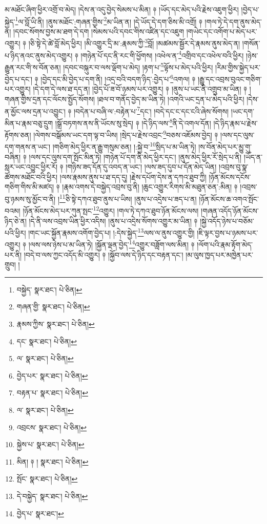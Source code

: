 མ་མཐོང་ཞིག་ཕྱིར་འགྲོ་བ་མེད། །དེས་ན་འདུ་བྱེད་སེམས་པ་མིན། ༈ །ཡོད་དང་མེད་པའི་རྗེས་འཇུག་ཕྱིར། །བྱེད་པ་སྐྱེད་\footnote{བསྐྱེད་  སྣར་ཐང་།  པེ་ཅིན། }ལ་བློ་ཡི་ནི། །ནུས་མཐོང་:གཞན་གྱིས་\footnote{གཞན་གྱི་  སྣར་ཐང་།  པེ་ཅིན། }མ་ཡིན་ན། །དེ་ཡོད་དེ་དག་ཅིས་མི་འགྲོ། ༈ །གལ་ཏེ་དེ་དག་ནུས་མེད་ན། །དབང་སོགས་བྱས་མ་ཐག་དེ་དག །སེམས་པའི་དབང་གིས་འཛིན་དང་འཇུག །གཡེང་དང་འགོག་པ་མེད་པར་འགྱུར། ༈ །ཅི་སྟེ་དེ་ཚེ་བློ་མེད་ཕྱིར། །མི་འགྱུར་དྲི་མ་:རྣམས་ཀྱི་\footnote{རྣམས་ཀྱིས་  སྣར་ཐང་།  པེ་ཅིན། }བློ། །མཚམས་སྦྱོར་དེ་རྣམས་ནུས་མེད་ན། །གསོན་པ་ཉིད་ནའང་ནུས་མེད་འགྱུར། ༈ །གཉེན་པོ་དང་ནི་རང་གི་ཕྱོགས། །འཕེལ་ན་\footnote{དང་  སྣར་ཐང་།  པེ་ཅིན། }འགྲིབ་དང་འཕེལ་བའི་ཕྱིར། །ཉེས་རྒྱུན་རང་གི་ས་བོན་ཅན། །དབང་བསྐུར་བ་ལས་ལྡོག་པ་མེད། །རྟག་པ་\footnote{ལ་  སྣར་ཐང་།  པེ་ཅིན། }ལྟོས་པ་མེད་པའི་ཕྱིར། །རིམ་གྱིས་སྐྱེད་པར་བྱེད་པ་དང་། ༈ །བྱེད་དང་མི་བྱེད་པ་དག་ནི། །འདྲ་བའི་བདག་ཉིད་:བྱེད་པ་\footnote{བྱེད་པར་  སྣར་ཐང་།  པེ་ཅིན། }འགལ། ༈ །རྒྱུ་དང་འབྲས་བུའང་གཅིག་པར་འགྱུར། །དེ་དག་དེ་ལས་ཐ་དད་ན། །བྱེད་པོ་ཟ་བོ་ཉམས་པར་འགྱུར། ༈ །ནུས་པ་ཡང་ནི་འགྲུབ་མ་ཡིན། ༈ །གཞན་གྱིས་དྲན་དང་ལོངས་སྤྱོད་སོགས། །ཐལ་བ་གནོད་བྱེད་མ་ཡིན་ཏེ། །འགའི་ཡང་དྲན་པ་མེད་པའི་ཕྱིར། །དེས་ན་མྱོང་ལས་དྲན་པ་འབྱུང་། ༈ །བདེན་པ་བཞི་ལ་:བརྟེན་པ་\footnote{བརྟན་པ་  སྣར་ཐང་།  པེ་ཅིན། }དང་། །བདེ་དང་ང་དང་ངའི་ཞེས་སོགས། །ཡང་དག་མིན་པ་རྣམ་བཅུ་དྲུག །སྒྲོ་བཏགས་ནས་ནི་ཡོངས་སུ་སྲེད། ༈ །དེ་ཉིད་ལས་\footnote{ལ་  སྣར་ཐང་།  པེ་ཅིན། }ནི་དེ་འགལ་དོན། །དེ་ཉིད་རྣམ་པ་རྗེས་རྟོགས་ཅན། །ལེགས་བསྒོམས་ཡང་དག་ལྟ་བ་ཡིས། །སྲེད་པ་རྗེས་འབྲང་\footnote{འབྲངས་  སྣར་ཐང་།  པེ་ཅིན། }བཅས་འཇོམས་བྱེད། ༈ །ལས་དང་ལུས་དག་གནས་ན་ཡང་། །གཅིག་མེད་ཕྱིར་ན་རྒྱུ་གསུམ་ཅན། །:སྐྱེ་བ་\footnote{སྐྱེས་པ་  སྣར་ཐང་།  པེ་ཅིན། }སྲིད་པ་མ་ཡིན་ཏེ། །ས་བོན་མེད་པར་མྱུ་གུ་བཞིན། ༈ །ལས་དང་ལུས་དག་སྤོང་མིན་ཏེ། །གཉེན་པོ་དག་ནི་མེད་ཕྱིར་དང་། །ནུས་མེད་ཕྱིར་རོ་སྲེད་པ་ནི། །ཡོད་ན་སླར་ཡང་འབྱུང་ཕྱིར་རོ། ༈ །གཉིས་ཟད་དོན་དུ་འབད་ན་ཡང་། །ལས་ཟད་དུབ་པ་དོན་མེད་ཡིན། །འབྲས་བུ་སྣ་ཚོགས་མཐོང་བའི་ཕྱིར། །ལས་རྣམས་ནུས་པ་ཐ་དད་དུ། །རྗེས་དཔོག་དེས་ན་དཀའ་ཐུབ་ཀྱི། །ཉོན་མོངས་དངོས་གཅིག་གིས་མི་མཛད། ༈ །རྣམ་འགས་དེ་བསྐྱེད་འབྲས་བུ་ནི། །ཆུང་འགྱུར་རིགས་མི་མཐུན་ཅན་:མིན། ༈ །འབྲས་བུ་ཉམས་སུ་མྱོང་བ་ནི། །\footnote{མིན། ༈ །  སྣར་ཐང་།  པེ་ཅིན། }ཅི་སྟེ་དཀའ་ཐུབ་ནུས་པ་ཡིས། །ནུས་པ་འདྲེས་པ་ཟད་པ་ན། །ཉོན་མོངས་ཆ་འགའ་སྤོང་བའམ། །ཉོན་མོངས་མེད་པར་ཀུན་སྤང་\footnote{སྤོང་  སྣར་ཐང་།  པེ་ཅིན། }འགྱུར། །གལ་ཏེ་དཀའ་ཐུབ་ཉོན་མོངས་ལས། །གཞན་འདོད་ཉོན་མོངས་ཉིད་ཅེ་ན། །དེ་ནི་ལས་འབྲས་ཡིན་ཕྱིར་འདིས། །ནུས་པ་འདྲེས་སོགས་འགྱུར་མ་ཡིན། ༈ །སྐྱེ་འདོད་ཉེས་པ་བཅོམ་པའི་ཕྱིར། །གང་ཡང་སྐྱོན་རྣམས་འགོག་བྱེད་པ། །:དེས་སྐྱེད་\footnote{དེ་བསྐྱེད་  སྣར་ཐང་།  པེ་ཅིན། }ལས་ལ་ནུས་འགྱུར་གྱི། །ཇི་ལྟར་བྱས་པ་ཉམས་པར་འགྱུར། ༈ །ལས་ལས་ཉེས་པ་མ་ཡིན་ཏེ། །སྐྱོན་ལྡན་བྱེད་\footnote{བྱེད་པ་  སྣར་ཐང་། }འགྱུར་བཟློག་ལས་མིན། ༈ །ལོག་པའི་རྣམ་རྟོག་མེད་པར་ནི། །བདེ་བ་ལས་ཀྱང་འདོད་མི་འགྱུར། ༈ །སྐྱོབ་ལས་དེ་ཉིད་དང་བརྟན་དང་། །མ་ལུས་ཁྱད་པར་མཁྱེན་པར་གྲུབ། །
